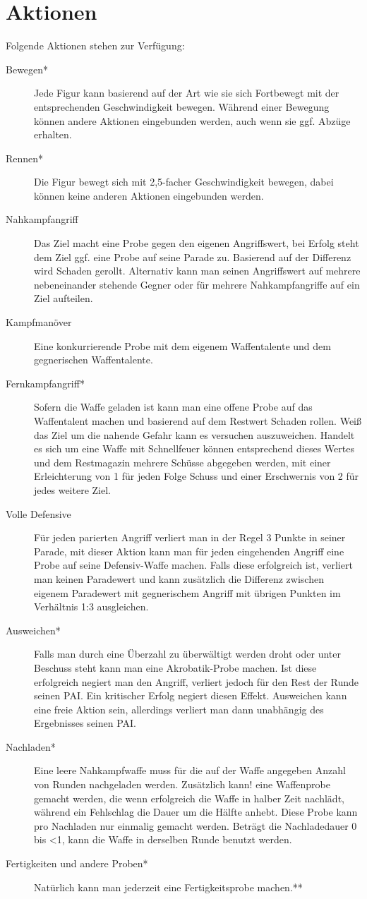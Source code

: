 \documentclass[a4paper,12pt,oneside]{book}
\begin{document}
\chapter{Aktionen}
Folgende Aktionen stehen zur Verfügung:
\begin{description}
\item[Bewegen*]Jede Figur kann basierend auf der Art wie sie sich Fortbewegt mit der entsprechenden Geschwindigkeit bewegen. Während einer Bewegung können andere Aktionen eingebunden werden, auch wenn sie ggf. Abzüge erhalten.
\item[Rennen*]Die Figur bewegt sich mit 2,5-facher Geschwindigkeit bewegen, dabei können keine anderen Aktionen eingebunden werden. 
\item[Nahkampfangriff]Das Ziel macht eine Probe gegen den eigenen Angriffswert, bei Erfolg steht dem Ziel ggf. eine Probe auf seine Parade zu. Basierend auf der Differenz wird Schaden gerollt. Alternativ kann man seinen Angriffswert auf mehrere nebeneinander stehende Gegner oder für mehrere Nahkampfangriffe auf ein Ziel aufteilen.
\item[Kampfmanöver]Eine konkurrierende Probe mit dem eigenem Waffentalente und dem gegnerischen Waffentalente.
\item[Fernkampfangriff*]Sofern die Waffe geladen ist kann man eine offene Probe auf das Waffentalent machen und basierend auf dem Restwert Schaden rollen. Weiß das Ziel um die nahende Gefahr kann es versuchen auszuweichen. Handelt es sich um eine Waffe mit Schnellfeuer können entsprechend dieses Wertes und dem Restmagazin mehrere Schüsse abgegeben werden, mit einer Erleichterung von 1 für jeden Folge Schuss und einer Erschwernis von 2 für jedes weitere Ziel.
\item[Volle Defensive]Für jeden parierten Angriff verliert man in der Regel 3 Punkte in seiner Parade, mit dieser Aktion kann man für jeden eingehenden Angriff eine Probe auf seine Defensiv-Waffe machen. Falls diese erfolgreich ist, verliert man keinen Paradewert und kann zusätzlich die Differenz zwischen eigenem Paradewert mit gegnerischem Angriff mit übrigen Punkten im Verhältnis 1:3 ausgleichen. 
\item[Ausweichen*]Falls man durch eine Überzahl zu überwältigt werden droht oder unter Beschuss steht kann man eine Akrobatik-Probe machen. Ist diese erfolgreich negiert man den Angriff, verliert jedoch für den Rest der Runde seinen PAI. Ein kritischer Erfolg negiert diesen Effekt. Ausweichen kann eine freie Aktion sein, allerdings verliert man dann unabhängig des Ergebnisses seinen PAI.
\item[Nachladen*]Eine leere Nahkampfwaffe muss für die auf der Waffe angegeben Anzahl von Runden nachgeladen werden. Zusätzlich kann! eine Waffenprobe gemacht werden, die wenn erfolgreich die Waffe in halber Zeit nachlädt, während ein Fehlschlag die Dauer um die Hälfte anhebt. Diese Probe kann pro Nachladen nur einmalig gemacht werden. Beträgt die Nachladedauer 0 bis <1, kann die Waffe in derselben Runde benutzt werden.
\item[Fertigkeiten und andere Proben*]Natürlich kann man jederzeit eine Fertigkeitsprobe machen.**
\end{description}
\end{document}
